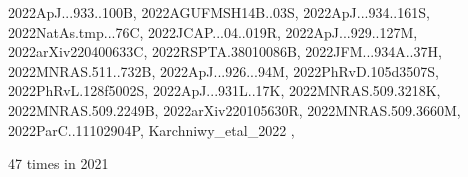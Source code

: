 \documentclass[12pt]{article}
\begin{document}
\begin{description}
{2022ApJ...933..100B,%
2022AGUFMSH14B..03S,%
2022ApJ...934..161S,%
2022NatAs.tmp...76C,%
2022JCAP...04..019R,%
2022ApJ...929..127M,%
2022arXiv220400633C,%
2022RSPTA.38010086B,%
2022JFM...934A..37H,%
2022MNRAS.511..732B,%
2022ApJ...926...94M,%
2022PhRvD.105d3507S,%
2022PhRvL.128f5002S,%
2022ApJ...931L..17K,%
2022MNRAS.509.3218K,%
2022MNRAS.509.2249B,%
2022arXiv220105630R,%
2022MNRAS.509.3660M,%
2022ParC..11102904P,%
Karchniwy_etal_2022%
},\item
\item %
47 times in 2021 \citep{
2021A&A...655A..79B,%
2021MNRAS.508.5538Y,%
}
\end{description}
\end{document}
